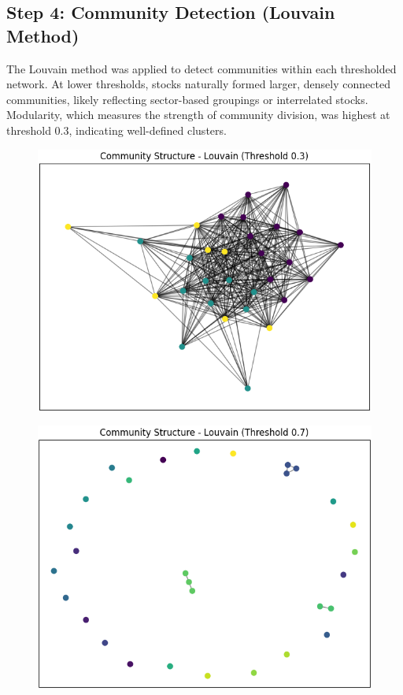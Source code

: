 \documentclass[12pt]{article}
\begin{document}
\subsection{Step 4: Community Detection (Louvain Method)}
The Louvain method was applied to detect communities within each thresholded network. At lower thresholds, stocks naturally formed larger, densely connected communities, likely reflecting sector-based groupings or interrelated stocks. Modularity, which measures the strength of community division, was highest at threshold 0.3, indicating well-defined clusters.
\begin{figure}[H]
    \centering
    \begin{minipage}[b]{0.45\textwidth}
        \centering
        \includegraphics[width=\textwidth]{louvain_network_stock_corr3.png}
        \label{fig:louvain_03}
    \end{minipage}
    \hfill
    \begin{minipage}[b]{0.45\textwidth}
        \centering
        \includegraphics[width=\textwidth]{louvain_network_stock_corr7.png}

\end{minipage}
\end{figure}
\end{document}
